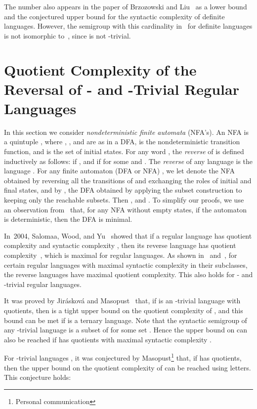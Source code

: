 \documentclass{llncs}
\begin{document}
\begin{remark}
The number  also appears in the paper of Brzozowski and Liu~\cite{BrLiu12} as a lower bound and the conjectured upper bound for the syntactic complexity of definite languages. However, the semigroup  with this cardinality in~\cite{BrLiu12} for definite languages is not isomorphic to~, since  is not -trivial. 
\end{remark}

\section{Quotient Complexity of the Reversal of - and -Trivial Regular Languages}\label{sec:rev}

In this section we consider \emph{nondeterministic finite automata} (NFA's). An NFA  is a quintuple , where , , and  are as in a DFA,  is the nondeterministic transition function, and  is the set of initial states. For any word , the \emph{reverse} of  is defined inductively as follows:  if , and  if  for some  and . The \emph{reverse} of any language  is the language . For any finite automaton (DFA or NFA) , we let  denote the NFA obtained by reversing all the transitions of  and exchanging the roles of initial and final states, and by , the DFA obtained by applying the subset construction to~  keeping only the reachable subsets. Then , and . To simplify our proofs, we use an observation from~\cite{Brz62} that, for any NFA  without empty states, if the automaton  is deterministic, then the DFA  is minimal. 

In~2004, Salomaa, Wood, and Yu~\cite{SWY04} showed that if a regular language  has quotient complexity  and syntactic complexity , then its reverse language  has quotient complexity~, which is maximal for regular languages. As shown in~\cite{BrYe11} and~\cite{BLY12}, for certain regular languages with maximal syntactic complexity in their subclasses, the reverse languages have maximal quotient complexity. This also holds for - and -trivial regular languages. 

It was proved by Jir{\'a}skov{\'a} and Masopust~\cite{JiMa12} that, if  is an -trivial language with  quotients, then  is a tight upper bound on the quotient complexity of , and this bound can be met if  is a ternary language. Note that the syntactic semigroup of any -trivial language is a subset of  for some set . Hence the upper bound  on  can also be reached if  has  quotients with maximal syntactic complexity . 


For -trivial languages , it was conjectured by Masopust\footnote{Personal communication} that, if  has  quotients, then the upper bound  on the quotient complexity of  can be reached using  letters. This conjecture holds:
\end{document}
